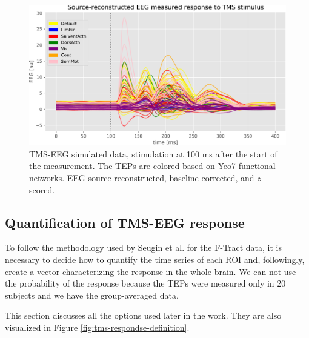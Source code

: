 \begin{figure}
    \centering
    \includegraphics[width=\textwidth]{images/nootebook_generated/tmseeg_results/simulated/200/not_over_threshold_nan/data.pdf}
    \caption[TMS-EEG simulated data]{TMS-EEG simulated data, stimulation at 100 ms after the start of the measurement. The TEPs are colored based on Yeo7 functional networks. EEG source reconstructed, baseline corrected, and $z$-scored.}
    \label{fig:tms-simulated-data}
\end{figure}

\subsection{Quantification of TMS-EEG response}

To follow the methodology used by Seugin et al. for the F-Tract data, it is necessary to decide how to quantify the time series of each ROI and, followingly, create a vector characterizing the response in the whole brain. We can not use the probability of the response because the TEPs were measured only in 20 subjects and we have the group-averaged data.

This section discusses all the options used later in the work. They are also visualized in Figure \ref{fig:tms-respondse-definition}.

